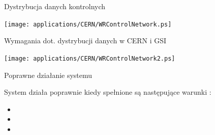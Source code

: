\documentclass[compress,red]{beamer}
\begin{document}
\begin{frame}{Dystrybucja danych kontrolnych}

    \begin{center}
    \texttt{[image: applications/CERN/WRControlNetwork.ps]}
    \end{center}


\end{frame}
\begin{frame}{Wymagania dot. dystrybucji danych w CERN i GSI}

    \begin{center}
    \texttt{[image: applications/CERN/WRControlNetwork2.ps]}
    \end{center}


\end{frame}
\begin{frame}{Poprawne działanie systemu}


  System działa poprawnie kiedy spełnione są następujące warunki :
  
  \begin{itemize}
    \item \color{blue}{Wszystkie odbiorniki (nodes) są z synchronizowane z wymaganą dokładnością}
    \item  \color{red}{Wszystkie odbiorniki (nodes) otrzymują dane kontrolne (Control Messages)}
    \item  \color{red}{Dane kontrolne (Control Messages) docierają do wszystkich odbiorników (nodes)
          w czasie mniejszym niż wymagana maksymalna latencja.}
  \end{itemize}

\end{frame}
\end{document}
